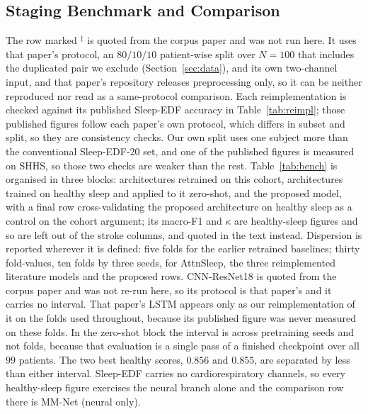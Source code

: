 \documentclass{ieeeaccess}
\begin{document}
\subsection{Staging Benchmark and Comparison}
The row marked $^{\ddagger}$ is quoted from the corpus paper and was not run here. It
uses that paper's protocol, an $80/10/10$ patient-wise split over $N=100$ that includes the
duplicated pair we exclude (Section~\ref{sec:data}), and its own two-channel input, and that
paper's repository releases preprocessing only, so it can be neither reproduced nor read as
a same-protocol comparison. Each reimplementation is checked against its published Sleep-EDF
accuracy in Table~\ref{tab:reimpl}; those published figures follow each paper's own protocol, which
differs in subset and split, so they are consistency checks.
Our own split uses one subject more than the conventional Sleep-EDF-20 set, and one of the
published figures is measured on SHHS, so those two checks are weaker
than the rest.
Table~\ref{tab:bench} is organised in three blocks: architectures retrained on this
cohort, architectures trained on healthy sleep and applied to it zero-shot, and the
proposed model, with a final row cross-validating the proposed architecture on healthy
sleep as a control on the cohort argument; its macro-F1 and $\kappa$ are healthy-sleep
figures and so are left out of the stroke columns, and quoted in the text instead.
Dispersion is reported wherever it is defined: five folds for the earlier retrained
baselines; thirty fold-values, ten folds by three seeds, for AttnSleep, the three
reimplemented literature models and the proposed rows. CNN-ResNet18 is quoted from the
corpus paper and was not re-run here, so its protocol is that paper's and it
carries no interval. That paper's LSTM appears only as our reimplementation of it on the
folds used throughout, because its published figure was never measured on these folds. In the zero-shot block the interval is across
pretraining seeds and not folds, because that evaluation is a single pass of a finished
checkpoint over all $99$ patients. The two best healthy scores, $0.856$ and $0.855$, are
separated by less than either interval. Sleep-EDF carries no cardiorespiratory channels, so every
healthy-sleep figure exercises the neural branch alone and the comparison row there is
MM-Net (neural only).
\end{document}
